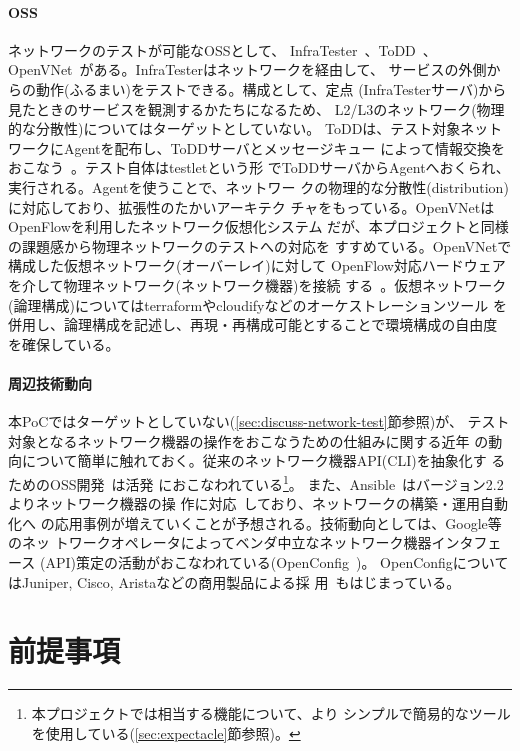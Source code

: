     \paragraph{OSS}
ネットワークのテストが可能なOSSとして、
InfraTester~\cite{infratester-github}、ToDD~\cite{todd-github}、
OpenVNet~\cite{openvnet-web}がある。InfraTesterはネットワークを経由して、
サービスの外側からの動作(ふるまい)をテストできる。構成として、定点
(InfraTesterサーバ)から見たときのサービスを観測するかたちになるため、
L2/L3のネットワーク(物理的な分散性)についてはターゲットとしていない。
ToDDは、テスト対象ネットワークにAgentを配布し、ToDDサーバとメッセージキュー
によって情報交換をおこなう~\cite{todd-blog}。テスト自体はtestletという形
でToDDサーバからAgentへおくられ、実行される。Agentを使うことで、ネットワー
クの物理的な分散性(distribution)に対応しており、拡張性のたかいアーキテク
チャをもっている。OpenVNetはOpenFlowを利用したネットワーク仮想化システム
だが、本プロジェクトと同様の課題感から物理ネットワークのテストへの対応を
すすめている。OpenVNetで構成した仮想ネットワーク(オーバーレイ)に対して
OpenFlow対応ハードウェアを介して物理ネットワーク(ネットワーク機器)を接続
する~\cite{openvnet-slide,network-testing-sdn-atmarkit}。仮想ネットワーク
(論理構成)についてはterraformやcloudifyなどのオーケストレーションツール
を併用し、論理構成を記述し、再現・再構成可能とすることで環境構成の自由度
を確保している。

    \paragraph{周辺技術動向}
本PoCではターゲットとしていない(\ref{sec:discuss-network-test}節参照)が、
テスト対象となるネットワーク機器の操作をおこなうための仕組みに関する近年
の動向について簡単に触れておく。従来のネットワーク機器API(CLI)を抽象化す
るためのOSS開発~\cite{netmiko-github,trigger-github,napalm-github}は活発
におこなわれている\footnote{本プロジェクトでは相当する機能について、より
シンプルで簡易的なツールを使用している(\ref{sec:expectacle}節参照)。}。
また、Ansible~\cite{ansible-web}はバージョン2.2よりネットワーク機器の操
作に対応~\cite{ansible-22-news}しており、ネットワークの構築・運用自動化へ
の応用事例が増えていくことが予想される。技術動向としては、Google等のネッ
トワークオペレータによってベンダ中立なネットワーク機器インタフェース
(API)策定の活動がおこなわれている(OpenConfig~\cite{openconfig})。
OpenConfigについてはJuniper, Cisco, Aristaなどの商用製品による採
用~\cite{openconfig-news}もはじまっている。

 \section{前提事項}
 \label{sec:premise}

